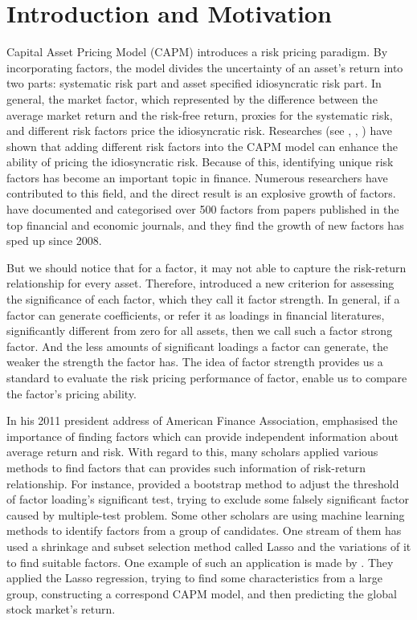 


\section{Introduction and Motivation}
Capital Asset Pricing Model (CAPM) \cite{Sharpe1964, Lintner1965, Black1972} introduces a risk pricing paradigm.
By incorporating factors, the model divides the uncertainty of an asset's return into two parts: systematic risk part and asset specified idiosyncratic risk part.
In general, the market factor, which represented by the difference between the average market return and the risk-free return, proxies for the systematic risk, and different risk factors price the idiosyncratic risk.
Researches (see , , ) have shown that adding different risk factors into the CAPM model can enhance the ability of pricing the idiosyncratic risk.
Because of this, identifying unique risk factors has become an important topic in finance.
Numerous researchers have contributed to this field, and the direct result is an explosive growth of factors.
  have documented and categorised over 500 factors from papers published in the top financial and economic journals, and they find the growth of new factors has sped up since 2008. 
 
But we should notice that for a factor, it may not able to capture the risk-return relationship for every asset.
Therefore,  introduced a new criterion for assessing the significance of each factor, which they call it factor strength.
In general, if a factor can generate coefficients, or refer it as loadings in financial literatures, significantly different from zero for all assets, then we call such a factor strong factor.
And the less amounts of significant loadings a factor can generate, the weaker the strength the factor has.
The idea of factor strength provides us a standard to evaluate the risk pricing performance of factor, enable us to compare the factor's pricing ability.

In his 2011 president address of American Finance Association, \citeauthor{Cochrane2011} emphasised the importance of finding factors which can provide independent information about average return and risk.
With regard to this, many scholars applied various methods to find factors that can provides such information of risk-return relationship.
For instance,  provided a bootstrap method to adjust the threshold of factor loading's significant test, trying to exclude some falsely significant factor caused by multiple-test problem.
Some other scholars are using machine learning methods to identify factors from a group of candidates.
One stream of them has used a shrinkage and subset selection method called Lasso \cite{Tibshirani1996} and the variations of it to find suitable factors.
One example of such an application is made by .
They applied the Lasso regression, trying to find some characteristics from a large group, constructing a correspond CAPM model, and then predicting the global stock market's return.

